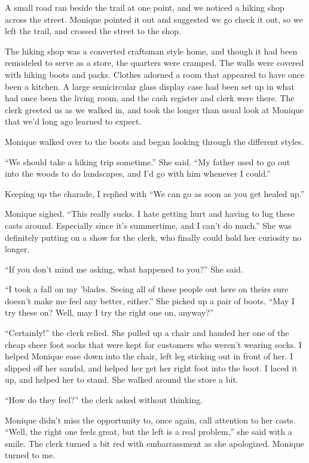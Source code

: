 A small road ran beside the trail at one point, and we noticed a hiking shop across the
street. Monique pointed it out and suggested we go check it out, so we left the trail, and
crossed the street to the shop.

The hiking shop was a converted craftsman style home, and though it had been remodeled to
serve as a store, the quarters were cramped. The walls were covered with hiking boots and packs.
Clothes adorned a room that appeared to have once been a kitchen. A large semicircular glass
display case had been set up in what had once been the living room, and the cash register and
clerk were there. The clerk greeted us as we walked in, and took the longer than usual look at
Monique that we'd long ago learned to expect.

Monique walked over to the boots and began looking through the different styles.

``We should take a hiking trip sometime.'' She said. ``My father used to go out into the woods
to do landscapes, and I'd go with him whenever I could.''

Keeping up the charade, I replied with ``We can go as soon as you get healed up.''

Monique sighed. ``This really sucks. I hate getting hurt and having to lug these casts
around. Especially since it's summertime, and I can't do much.'' She was definitely putting on a
show for the clerk, who finally could hold her curiosity no longer.

``If you don't mind me asking, what happened to you?'' She said.

``I took a fall on my 'blades. Seeing all of these people out here on theirs sure doesn't
make me feel any better, either.'' She picked up a pair of boots. ``May I try these on? Well,
may
I try the right one on, anyway?''

``Certainly!'' the clerk relied. She pulled up a chair and handed her one of the cheap sheer
foot socks that were kept for customers who weren't wearing socks. I helped Monique ease down
into the chair, left leg sticking out in front of her. I slipped off her sandal, and helped her
get her right foot into the boot. I laced it up, and helped her to stand. She walked around the
store a bit.

``How do they feel?'' the clerk asked without thinking.

Monique didn't miss the opportunity to, once again, call attention to her casts. ``Well, the
right one feels great, but the left is a real problem,'' she said with a smile. The clerk turned
a bit red with embarrassment as she apologized. Monique turned to me.

